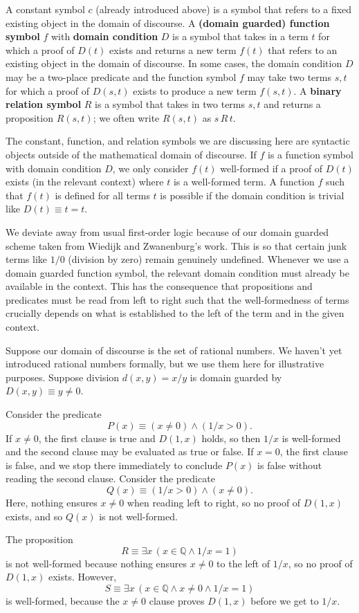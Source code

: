 A constant symbol $c$ (already introduced above) is a symbol that refers to a fixed existing object in the domain of discourse. 
A \textbf{(domain guarded) function symbol} $f$ with \textbf{domain condition} $D$ is a symbol that takes in a term $t$ for which a proof of $D(t)$ exists and returns a new term $f(t)$ that refers to an existing object in the domain of discourse. 
In some cases, the domain condition $D$ may be a two-place predicate and the function symbol $f$ may take two terms $s, t$ for which a proof of $D(s, t)$ exists to produce a new term $f(s, t)$. 
A \textbf{binary relation symbol} $R$ is a symbol that takes in two terms $s, t$ and returns a proposition $R(s, t)$; we often write $R(s, t)$ as $s\, R\, t$. 

The constant, function, and relation symbols we are discussing here are syntactic objects outside of the mathematical domain of discourse. 
If $f$ is a function symbol with domain condition $D$, we only consider $f(t)$ well-formed if a proof of $D(t)$ exists (in the relevant context) where $t$ is a well-formed term.
A function $f$ such that $f(t)$ is defined for all terms $t$ is possible if the domain condition is trivial like $D(t)\equiv t=t$.

We deviate away from usual first-order logic because of our domain guarded scheme taken from Wiedijk and Zwanenburg's work. %
This is so that certain junk terms like $1/0$ (division by zero) remain genuinely undefined.
Whenever we use a domain guarded function symbol, the relevant domain condition must already be available in the context.
This has the consequence that propositions and predicates must be read from left to right such that the well-formedness of terms crucially depends on what is established to the left of the term and in the given context. 

\begin{example}
	Suppose our domain of discourse is the set of rational numbers.
	We haven't yet introduced rational numbers formally, but we use them here for illustrative purposes. 
	Suppose division $d(x, y) = x/y$ is domain guarded by $D(x, y)\equiv y\ne 0$. 
	
	Consider the predicate
	\[ P(x)\equiv (x\ne 0)\land (1/x > 0). \]
	If $x\ne 0$, the first clause is true and $D(1, x)$ holds, so then $1/x$ is well-formed and the second clause may be evaluated as true or false.
	If $x = 0$, the first clause is false, and we stop there immediately to conclude $P(x)$ is false without reading the second clause.
	Consider the predicate 
	\[ Q(x)\equiv (1/x > 0)\land (x\ne 0). \]
	Here, nothing ensures $x\ne 0$ when reading left to right, so no proof of $D(1, x)$ exists, and so $Q(x)$ is not well-formed.
	
	The proposition
	\[ R\equiv \exists x\, (x\in\mathbb{Q}\land 1/x = 1) \]
	is not well-formed because nothing ensures $x\ne 0$ to the left of $1/x$, so no proof of $D(1, x)$ exists.
	However,
	\[ S\equiv \exists x\, (x\in\mathbb{Q}\land x\ne 0\land 1/x = 1) \]
	is well-formed, because the $x\ne 0$ clause proves $D(1, x)$ before we get to $1/x$. 
\end{example}

